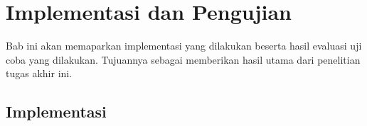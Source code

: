 \chapter{Implementasi dan Pengujian}
\label{chapter:implementasi-dan-pengujian}
Bab ini akan memaparkan implementasi yang dilakukan beserta hasil evaluasi uji coba yang dilakukan. Tujuannya sebagai memberikan hasil utama dari penelitian tugas akhir ini.

\section{Implementasi}

% 

% 

